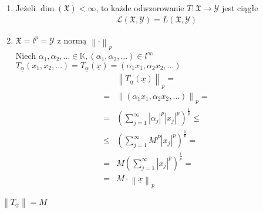\begin{prz}
\begin{enumerate}
\item Jeżeli $ \dim(\mathfrak X)<\infty  $, to każde odwzorowanie $ T:\mathfrak X\to \mathcal Y $ jest ciągłe
\begin{gather*}
\mathcal L\left(\mathfrak X,\mathcal Y\right)=L\left(\mathfrak X,\mathcal Y\right)
\end{gather*}
\item $ \mathfrak X=l^p=\mathcal Y $ z normą $ \left\|\cdot \right\| _p$\\
Niech $ \alpha_1,\alpha_2,\dots\in\mathbb K,\left(\alpha_1,\alpha_2,\dots \right)\in l^\infty  $\\
$ T_{\underline \alpha}\left(x_1,x_2,\dots \right)=T_{\underline \alpha}\left(\underline x\right)=\left(\alpha_1x_1,\alpha_2x_2,\dots \right)$
\begin{align*}
&\left\|T_{\underline \alpha}\left(\underline x\right)\right\|_p
=\\=&
\left\|\left(\alpha_1x_1,\alpha_2x_2,\dots \right)\right\|_p
=\\=&
\left(\sum_{j=1}^{\infty }\left|\alpha_j\right|^p\left|x_j\right|^p\right)^\frac{1}{p}
\le\\\le&
\left(\sum_{j=1}^{\infty }M^P\left|x_j\right|^p\right)^\frac{1}{p}
=\\=&
M\left(\sum_{j=1}^{\infty }\left|x_j\right|^p\right)^\frac{1}{p}
=\\=&
M\cdot \left\|\underline x\right\|_p
\end{align*}
\end{enumerate}
$ \left\|T_{\underline \alpha}\right\| =M$
\end{prz}